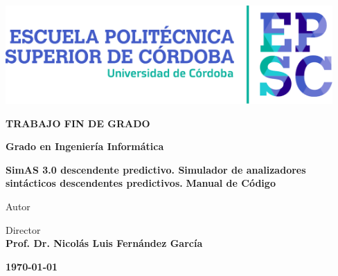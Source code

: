 \documentclass[a4paper,12pt,twoside,final]{book}
\begin{document}
\renewcommand*\listtablename{Índice de tablas}
\renewcommand{\tablename}{Tabla}
\begin{center}
\fontfamily{\sfdefault}\selectfont
\vspace*{2cm}

\vfill
\vfill
\includegraphics[width=12.5cm]{UCO/LogotipoEPSC.pdf}
\vfill
\vfill

\large\textbf{\color{epsc:medio}
  TRABAJO FIN DE GRADO
}
\vfill

\Large\textbf{\color{epsc:verde}
  Grado en Ingeniería Informática
}
\vfill
\vfill

\Huge\textbf{\color{epsc:oscuro}
  SimAS 3.0 descendente predictivo. Simulador de analizadores sintácticos descendentes predictivos.
}
\vfill
\vfill
\Large\textbf{\color{epsc:verde}
  Manual de Código
}
\vfill
\vfill


\large{\color{epsc:oscuro}Autor}\\
\textbf{\color{epsc:medio}{D. Antonio Llamas García }}
\vfill

\large{\color{epsc:oscuro} Director }\\
\textbf{\color{epsc:medio} Prof. Dr. Nicolás Luis Fernández García }
\vfill



\textbf{\color{epsc:verde} \monthyeardate\today}
\vfill
\vfill
\vspace{2.7cm}
\end{center}


\thispagestyle{empty}
\pagecolor{white}
\vspace*{2cm}


\cleardoublepage
\setcounter{page}{1}
\setcounter{tocdepth}{3} %
\setcounter{secnumdepth}{3} %
\tableofcontents
\listoffigures

\afterpage{\null\newpage}
\thispagestyle{empty}
\newpage
\mainmatter


\end{document}
